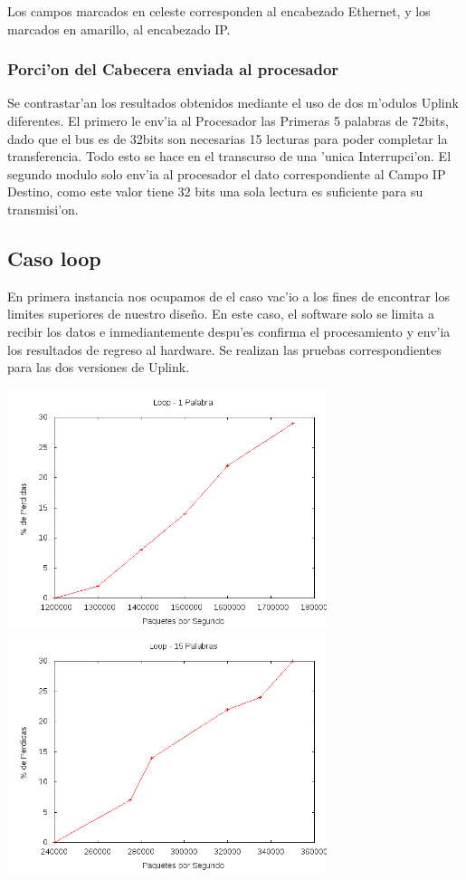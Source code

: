 \documentclass[12pt,spanish]{article}
\begin{document}
Los campos marcados en celeste corresponden al encabezado Ethernet, y los marcados en amarillo, al encabezado IP.

\subsubsection*{Porci'on del  Cabecera enviada al procesador}

Se contrastar'an los resultados obtenidos mediante el uso de dos m'odulos Uplink diferentes. El primero le env'ia al Procesador las Primeras 5 palabras de 72bits, dado que el bus es de 32bits son necesarias 15 lecturas para poder completar la transferencia. Todo esto se hace en el transcurso de una 'unica Interrupci'on. El segundo modulo solo env'ia al procesador el dato correspondiente al Campo IP Destino, como este valor tiene 32 bits una sola lectura es suficiente para su transmisi'on. 

\subsection*{Caso loop}
En primera instancia nos ocupamos de el caso vac'io a los fines de encontrar los limites superiores de nuestro dise\~no.  En este caso, el software solo se limita a recibir los datos e inmediantemente despu'es confirma el procesamiento y env'ia los resultados de regreso al hardware. Se realizan las pruebas correspondientes para las dos versiones de Uplink.

\begin{center}
	\includegraphics[width=0.70\textwidth]{graf/loop1p.png}
	\includegraphics[width=0.70\textwidth]{graf/loop15p.png}
\end{center}
\end{document}
